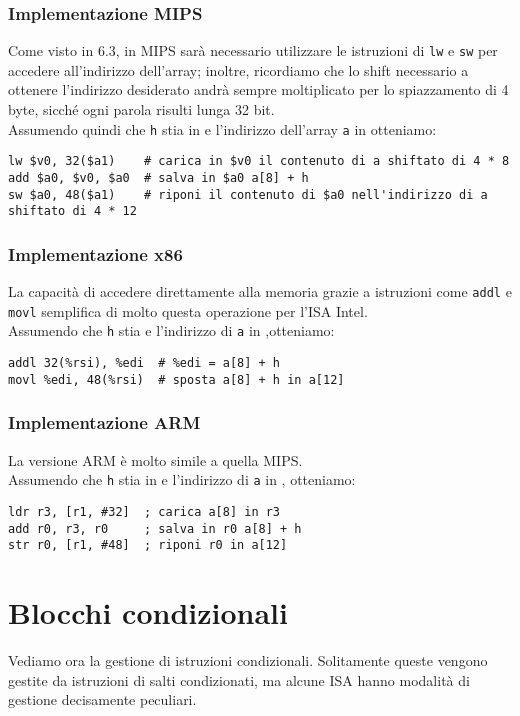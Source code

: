 \documentclass[class=book, crop=false, oneside]{standalone}
\begin{document}
\subsubsection{Implementazione MIPS}
Come visto in 6.3, in MIPS sarà necessario utilizzare le istruzioni di \texttt{lw} e \texttt{sw} per accedere all'indirizzo dell'array; inoltre, ricordiamo che  lo shift necessario a ottenere l'indirizzo desiderato andrà sempre moltiplicato per lo spiazzamento di 4 byte, sicché ogni parola risulti lunga 32 bit.\\
Assumendo quindi che \texttt{h} stia in  e l'indirizzo dell'array \texttt{a} in  otteniamo:
\begin{verbatim}
lw $v0, 32($a1)    # carica in $v0 il contenuto di a shiftato di 4 * 8
add $a0, $v0, $a0  # salva in $a0 a[8] + h
sw $a0, 48($a1)    # riponi il contenuto di $a0 nell'indirizzo di a shiftato di 4 * 12
\end{verbatim}

\subsubsection{Implementazione x86}
La capacità di accedere direttamente alla memoria grazie a istruzioni come \texttt{addl} e \texttt{movl} semplifica di molto questa operazione per l'ISA Intel.\\
Assumendo che  \texttt{h} stia  e l'indirizzo di \texttt{a} in ,otteniamo:
\begin{verbatim}
addl 32(%rsi), %edi  # %edi = a[8] + h
movl %edi, 48(%rsi)  # sposta a[8] + h in a[12]
\end{verbatim}

\subsubsection{Implementazione ARM}
La versione ARM è molto simile a quella MIPS.\\
Assumendo che \texttt{h} stia in  e l'indirizzo di \texttt{a} in , otteniamo:
\begin{verbatim}
ldr r3, [r1, #32]  ; carica a[8] in r3
add r0, r3, r0     ; salva in r0 a[8] + h
str r0, [r1, #48]  ; riponi r0 in a[12]
\end{verbatim}


\section{Blocchi condizionali}
Vediamo ora la gestione di istruzioni condizionali. Solitamente queste vengono gestite da istruzioni di salti condizionati, ma alcune ISA hanno modalità di gestione decisamente peculiari.
\end{document}
